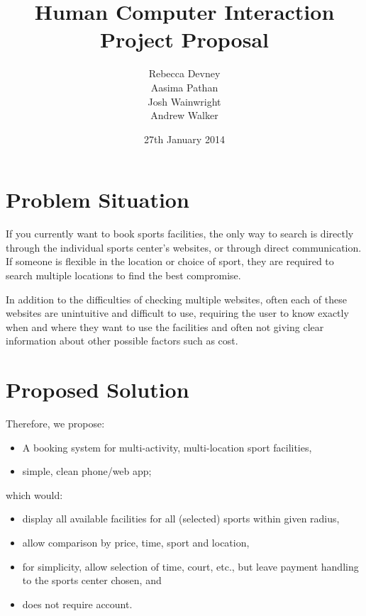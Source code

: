 \documentclass[11pt]{article} %
\author{}
\title{Human Computer Interaction \\ Project Proposal}
\author{%
    Rebecca Devney \\
    Aasima Pathan \\
    Josh Wainwright \\
    Andrew Walker
}
\date{27th January 2014}
\begin{document}
\maketitle

\section{Problem Situation}
\label{sec:problem_situation}

If you currently want to book sports facilities, the only way to search is
directly through the individual sports center's websites, or through direct
communication. If someone is flexible in the location or choice of sport, they
are required to search multiple locations to find the best compromise.

In addition to the difficulties of checking multiple websites, often each of
these websites are unintuitive and difficult to use, requiring the user to know
exactly when and where they want to use the facilities and often not giving
clear information about other possible factors such as cost.


\section{Proposed Solution}
\label{sec:proposed_solution}

Therefore, we propose:
\begin{itemize}
    \item A booking system for multi-activity, multi-location sport facilities,
    \item simple, clean phone/web app;
\end{itemize}
which would:
\begin{itemize}
    \item display all available facilities for all (selected) sports within
        given radius,
    \item allow comparison by price, time, sport and location,
    \item for simplicity, allow selection of time, court, etc., but leave
        payment handling to the sports center chosen, and
    \item does not require account.
\end{itemize}

\end{document}
